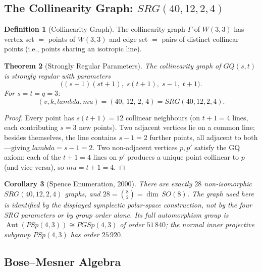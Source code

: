 \documentclass[12pt,a4paper]{article}
\def\mathrm#1{#1}%
\def\mathbf#1{#1}%
\def\textbf#1{#1}%
\def\lambda{lambda}%
\def\mu{mu}%
\newtheorem{theorem}{Theorem}[section]
\newtheorem{corollary}[theorem]{Corollary}
\theoremstyle{definition}
\newtheorem{definition}[theorem]{Definition}
\newcommand{\SRG}{\mathrm{SRG}}
\newcommand{\GQ}{\mathrm{GQ}}
\newcommand{\PSp}{\mathrm{PSp}}
\newcommand{\PGSp}{\mathrm{PGSp}}
\newcommand{\SO}{\mathrm{SO}}
\begin{document}
\subsection{\texorpdfstring{The Collinearity Graph: $\SRG(40,12,2,4)$}{The Collinearity Graph: SRG(40,12,2,4)}}
\label{ssec:srg}

\begin{definition}[Collinearity Graph]
\label{def:coll}
The \textbf{collinearity graph} $\Gamma$ of $W(3,3)$ has
vertex set $=$ points of $W(3,3)$
and edge set $=$ pairs of distinct collinear points
(i.e., points sharing an isotropic line).
\end{definition}

\begin{theorem}[Strongly Regular Parameters]
\label{thm:srg}
The collinearity graph of $\GQ(s,t)$ is strongly regular with parameters
\begin{equation}
\boxed{\bigl((s+1)(st+1),\; s(t+1),\; s-1,\; t+1\bigr).}
\label{eq:gq-to-srg}
\end{equation}
For $s=t=q=3$:
\begin{equation}
(v,k,\lambda,\mu) = (40,\,12,\,2,\,4) = \SRG(40,12,2,4).
\end{equation}
\end{theorem}

\begin{proof}
Every point has $s(t+1) = 12$ collinear neighbours (on $t+1=4$ lines,
each contributing $s=3$ new points).
Two adjacent vertices lie on a common line; besides themselves, the line
contains $s-1=2$ further points, all adjacent to both---giving
$\lambda = s-1 = 2$.
Two non-adjacent vertices $p,p'$ satisfy the GQ axiom: each of the
$t+1=4$ lines on $p'$ produces a unique point collinear to $p$
(and vice versa), so $\mu = t+1 = 4$.
\end{proof}

\begin{corollary}[Spence Enumeration, 2000]
There are exactly $\mathbf{28}$ non-isomorphic $\SRG(40,12,2,4)$ graphs,
and $28 = \binom{8}{2} = \dim\,\SO(8)$.
The graph used here is identified by the displayed symplectic polar-space
construction, not by the four SRG parameters or by group order alone.  Its
full automorphism group is
$\operatorname{Aut}(\PSp(4,3))\cong\PGSp(4,3)$ of order $51\,840$; the
normal inner projective subgroup $\PSp(4,3)$ has order $25\,920$.
\end{corollary}

\subsection{Bose--Mesner Algebra}
\end{document}
